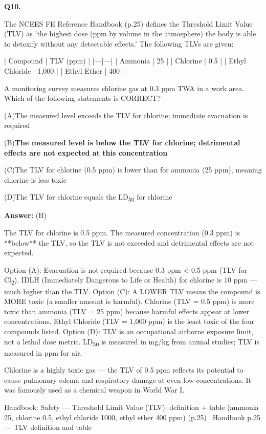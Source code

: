 \documentclass[11pt]{article}
\newcommand{\correct}[1]{\textbf{#1}\;{\color{accent}$\checkmark$}}
\newcommand{\optline}[2]{\par\noindent\hspace{1.2em}(#1)\hspace{0.6em}#2}
\begin{document}
\vspace{9pt}
\filbreak
\textbf{\color{accent}Q10.}\par\vspace{2pt}
The NCEES FE Reference Handbook (p.25) defines the Threshold Limit Value (TLV) as 'the highest dose (ppm by volume in the atmosphere) the body is able to detoxify without any detectable effects.' The following TLVs are given:

| Compound | TLV (ppm) |
|---|---|
| Ammonia | 25 |
| Chlorine | 0.5 |
| Ethyl Chloride | 1,000 |
| Ethyl Ether | 400 |

A monitoring survey measures chlorine gas at 0.3 ppm TWA in a work area. Which of the following statements is CORRECT?\par\vspace{3pt}
\optline{A}{The measured level exceeds the TLV for chlorine; immediate evacuation is required}
\optline{B}{\correct{The measured level is below the TLV for chlorine; detrimental effects are not expected at this concentration}}
\optline{C}{The TLV for chlorine (0.5 ppm) is lower than for ammonia (25 ppm), meaning chlorine is less toxic}
\optline{D}{The TLV for chlorine equals the LD\textsubscript{5}\textsubscript{0} for chlorine}
\par\vspace{3pt}
\vspace{2pt}\par\noindent\colorbox{boxbg}{\parbox{\dimexpr\linewidth-2\fboxsep\relax}{%
\vspace{2pt}\textbf{Answer:} (B)\par\vspace{2pt}
{\small The TLV for chlorine is 0.5 ppm. The measured concentration (0.3 ppm) is **below** the TLV, so the TLV is not exceeded and detrimental effects are not expected.

Option (A): Evacuation is not required because 0.3 ppm < 0.5 ppm (TLV for Cl\textsubscript{2}). IDLH (Immediately Dangerous to Life or Health) for chlorine is 10 ppm --- much higher than the TLV. Option (C): A LOWER TLV means the compound is MORE toxic (a smaller amount is harmful). Chlorine (TLV = 0.5 ppm) is more toxic than ammonia (TLV = 25 ppm) because harmful effects appear at lower concentrations. Ethyl Chloride (TLV = 1,000 ppm) is the least toxic of the four compounds listed. Option (D): TLV is an occupational airborne exposure limit, not a lethal dose metric. LD\textsubscript{5}\textsubscript{0} is measured in mg/kg from animal studies; TLV is measured in ppm for air.

Chlorine is a highly toxic gas --- the TLV of 0.5 ppm reflects its potential to cause pulmonary edema and respiratory damage at even low concentrations. It was famously used as a chemical weapon in World War I.}\par\vspace{2pt}
{\footnotesize\color{soft}Handbook: Safety --- Threshold Limit Value (TLV): definition + table (ammonia 25, chlorine 0.5, ethyl chloride 1000, ethyl ether 400 ppm) (p.25) \textbullet\ Handbook p.25 --- TLV definition and table}\vspace{2pt}
}}
\end{document}
